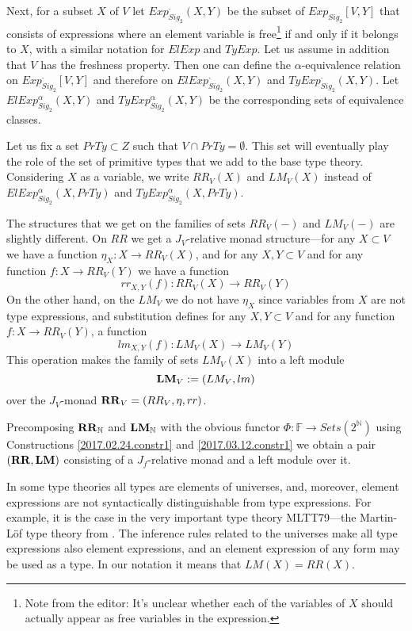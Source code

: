 \documentclass[onecolumn,12pt]{amsart}
\numberwithin{proposition}{subsection}
\newcommand{\sr}{\rightarrow}
\newcommand{\nn}{{\mathbb N}}
\newcommand{\nat}{\nn}
\newcommand{\RR}{{\bf RR}}
\newcommand{\LM}{{\bf LM}}
\newcommand{\FF}{{\mathbb F}}
\newcommand{\editorfootnote}[1]{\footnote{Note from the editor: #1}}
\begin{document}
Next, for a subset $X$ of $V$ let $Exp^{\cdot}_{Sig_2}(X,Y)$ be the subset of
$Exp_{Sig_2}[V,Y]$ that consists of expressions where an element variable is
free\editorfootnote{It's unclear whether each of the variables of $X$ should actually
  appear as free variables in the expression.} if and only if it belongs to $X$, with a similar notation for $ElExp$ and
$TyExp$. Let us assume in addition that $V$ has the freshness property. Then
one can define the $\alpha$-equivalence relation on $Exp^{\cdot}_{Sig_2}[V,Y]$
and therefore on $ElExp^{\cdot}_{Sig_2}(X,Y)$ and
$TyExp^{\cdot}_{Sig_2}(X,Y)$. Let $ElExp^{\alpha}_{Sig_2}(X,Y)$ and
$TyExp_{Sig_2}^{\alpha}(X,Y)$ be the corresponding sets of equivalence classes.

Let us fix a set $PrTy\subset Z$ such that $V\cap PrTy=\emptyset$. This set
will eventually play the role of the set of primitive types that we add to the
base type theory. Considering $X$ as a variable, we write $RR_V(X)$ and $LM_V(X)$
instead of $ElExp^{\alpha}_{Sig_2}(X,PrTy)$ and
$TyExp_{Sig_2}^{\alpha}(X,PrTy)$.

The structures that we get on the families of sets $RR_V(-)$ and $LM_V(-)$ are
slightly different. On $RR$ we get a $J_V$-relative monad structure---for any
$X\subset V$ we have a function $\eta_X:X\sr RR_V(X)$, and for any $X,Y\subset V$
and for any function $f:X\sr RR_V(Y)$ we have a function
%
$$rr_{X,Y}(f):RR_V(X)\sr RR_V(Y)$$
%
On the other hand, on the $LM_V$ we do not have $\eta_X$ since variables from
$X$ are not type expressions, and substitution defines for any $X,Y\subset V$
and for any function $f:X\sr RR_V(Y)$, a function
%
$$lm_{X,Y}(f):LM_V(X)\sr LM_V(Y)$$
%
This operation makes the family of sets $LM_V(X)$ into a left module
$$\LM_V:=(LM_V, lm)$$ over the $J_V$-monad $\RR_V=(RR_V,\eta,rr)$.

Precomposing $\RR_{\nat}$ and $\LM_{\nat}$ with the obvious functor
$\Phi:\FF\sr Sets(2^{\nat})$ using Constructions \ref{2017.02.24.constr1} and
\ref{2017.03.12.constr1} we obtain a pair $(\RR,\LM)$ consisting of a $J_f$-relative monad
and a left module over it.

In some type theories all types are elements of universes, and, moreover, element
expressions are not syntactically distinguishable from type expressions. For
example, it is the case in the very important type theory MLTT79---the
Martin-L\"{o}f type theory from \cite{MLTT79}. The inference rules related to
the universes \cite[p.~172]{MLTT79} make all type expressions also element
expressions, and an element expression of any form may be used as a type. In our
notation it means that $LM(X)=RR(X)$.
\end{document}
